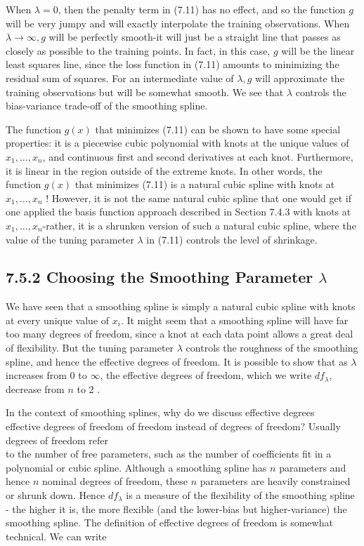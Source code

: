 \documentclass[10pt]{article}
\begin{document}
When $\lambda=0$, then the penalty term in (7.11) has no effect, and so the function $g$ will be very jumpy and will exactly interpolate the training observations. When $\lambda \rightarrow \infty, g$ will be perfectly smooth-it will just be a straight line that passes as closely as possible to the training points. In fact, in this case, $g$ will be the linear least squares line, since the loss function in (7.11) amounts to minimizing the residual sum of squares. For an intermediate value of $\lambda, g$ will approximate the training observations but will be somewhat smooth. We see that $\lambda$ controls the bias-variance trade-off of the smoothing spline.

The function $g(x)$ that minimizes (7.11) can be shown to have some special properties: it is a piecewise cubic polynomial with knots at the unique values of $x_{1}, \ldots, x_{n}$, and continuous first and second derivatives at each knot. Furthermore, it is linear in the region outside of the extreme knots. In other words, the function $g(x)$ that minimizes (7.11) is a natural cubic spline with knots at $x_{1}, \ldots, x_{n}$ ! However, it is not the same natural cubic spline that one would get if one applied the basis function approach described in Section 7.4.3 with knots at $x_{1}, \ldots, x_{n}$-rather, it is a shrunken version of such a natural cubic spline, where the value of the tuning parameter $\lambda$ in (7.11) controls the level of shrinkage.

\subsection*{7.5.2 Choosing the Smoothing Parameter $\lambda$}
We have seen that a smoothing spline is simply a natural cubic spline with knots at every unique value of $x_{i}$. It might seem that a smoothing spline will have far too many degrees of freedom, since a knot at each data point allows a great deal of flexibility. But the tuning parameter $\lambda$ controls the roughness of the smoothing spline, and hence the effective degrees of freedom. It is possible to show that as $\lambda$ increases from 0 to $\infty$, the effective degrees of freedom, which we write $d f_{\lambda}$, decrease from $n$ to 2 .

In the context of smoothing splines, why do we discuss effective degrees\\
effective degrees of freedom of freedom instead of degrees of freedom? Usually degrees of freedom refer\\
to the number of free parameters, such as the number of coefficients fit in a polynomial or cubic spline. Although a smoothing spline has $n$ parameters and hence $n$ nominal degrees of freedom, these $n$ parameters are heavily constrained or shrunk down. Hence $d f_{\lambda}$ is a measure of the flexibility of the smoothing spline - the higher it is, the more flexible (and the lower-bias but higher-variance) the smoothing spline. The definition of effective degrees of freedom is somewhat technical. We can write
\end{document}

